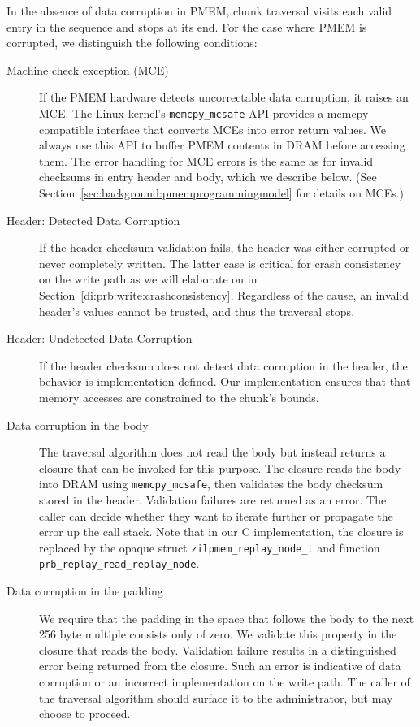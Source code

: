 \documentclass[12pt,a4paper,twoside]{book}
\begin{document}
In the absence of data corruption in PMEM, chunk traversal visits each valid entry in the sequence and stops at its end.
For the case where PMEM is corrupted, we distinguish the following conditions:
\begin{description}
    \item[Machine check exception (MCE)] If the PMEM hardware detects uncorrecta\-ble data corruption, it raises an MCE.
        The Linux kernel's \lstinline{memcpy_mcsafe} API provides a memcpy-compatible interface that converts MCEs into error return values.
        We always use this API to buffer PMEM contents in DRAM before accessing them.
        The error handling for MCE errors is the same as for invalid checksums in entry header and body, which we describe below.
        (See Section~\ref{sec:background:pmemprogrammingmodel} for details on MCEs.)
    \item[Header: Detected Data Corruption]
        If the header checksum validation fails, the header was either corrupted or never completely written.
        The latter case is critical for crash consistency on the write path as we will elaborate on in Section~\ref{di:prb:write:crashconsistency}.
        Regardless of the cause, an invalid header's values cannot be trusted, and thus the traversal stops.
    \item[Header: Undetected Data Corruption]
        If the header checksum does not detect data corruption in the header, the behavior is implementation defined.
        Our implementation ensures that that memory accesses are constrained to the chunk's bounds.
    \item[Data corruption in the body]
        The traversal algorithm does not read the body but instead returns a closure that can be invoked for this purpose.
        The closure reads the body into DRAM using \lstinline{memcpy_mcsafe}, then validates the body checksum stored in the header.
        Validation failures are returned as an error.
        The caller can decide whether they want to iterate further or propagate the error up the call stack.
        Note that in our C implementation, the closure is replaced by the opaque struct \lstinline{zilpmem_replay_node_t} and function \lstinline{prb_replay_read_replay_node}.
    \item[Data corruption in the padding]
        We require that the padding in the space that follows the body to the next 256 byte multiple consists only of zero.
        We validate this property in the closure that reads the body.
        Validation failure results in a distinguished error being returned from the closure.
        Such an error is indicative of data corruption or an incorrect implementation on the write path.
        The caller of the traversal algorithm should surface it to the administrator, but may choose to proceed.
\end{description}
\end{document}
